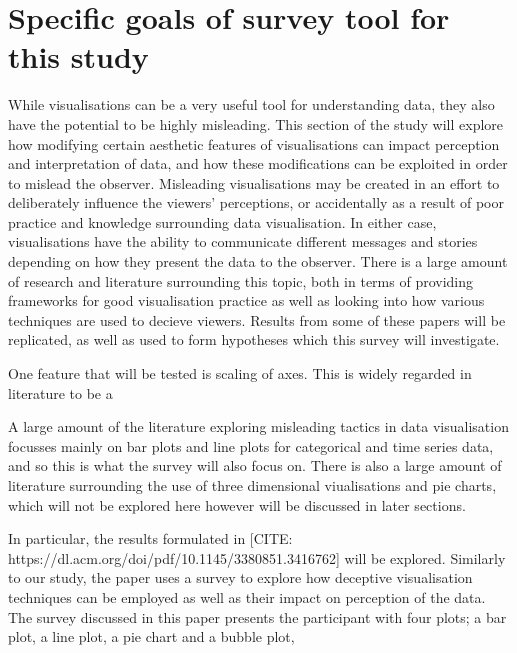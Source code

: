 \section{Specific goals of survey tool for this study}
While visualisations can be a very useful tool for understanding data, they also have the potential to be highly misleading. This section of the 
study will explore how modifying certain aesthetic features of visualisations can impact perception and interpretation of data, and how these 
modifications can be exploited in order to mislead the observer. Misleading visualisations may be created in an effort to deliberately influence the 
viewers' perceptions, or accidentally as a result of poor practice and knowledge surrounding data visualisation. In either case, visualisations have the
ability to communicate different messages and stories depending on how they present the data to the observer. There is a large amount of research and 
literature surrounding this topic, both in terms of providing frameworks for good visualisation practice as well as looking into how various techniques 
are used to decieve viewers. Results from some of these papers will be replicated, as well as used to form hypotheses which this survey will investigate.\newline

One feature that will be tested is scaling of axes. This is widely regarded in literature to be a 

 





A large amount of the literature exploring misleading tactics in data visualisation focusses mainly on bar plots and line plots for categorical and 
time series data, and so this is what the survey will also focus on. There is also a large amount of literature surrounding the use of three dimensional 
viualisations and pie charts, which will not be explored here however will be discussed in later sections. 


In particular, the results formulated in [CITE: https://dl.acm.org/doi/pdf/10.1145/3380851.3416762] will
be explored. Similarly to our study, the paper uses a survey to explore how deceptive visualisation techniques can be employed as well as their impact 
on perception of the data. The survey discussed in this paper presents the participant with four plots; a bar plot, a line plot, a pie chart and a 
bubble plot, 









